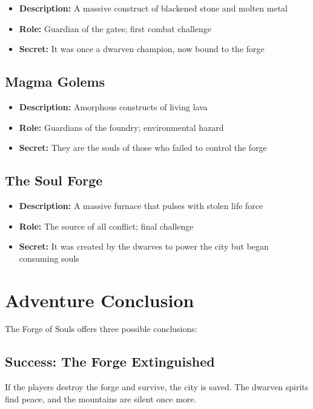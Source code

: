 \documentclass[11pt]{article}
\begin{document}
\begin{itemize}
    \item \textbf{Description:} A massive construct of blackened stone and molten metal
    \item \textbf{Role:} Guardian of the gates; first combat challenge
    \item \textbf{Secret:} It was once a dwarven champion, now bound to the forge
\end{itemize}

\subsection{Magma Golems}

\begin{itemize}
    \item \textbf{Description:} Amorphous constructs of living lava
    \item \textbf{Role:} Guardians of the foundry; environmental hazard
    \item \textbf{Secret:} They are the souls of those who failed to control the forge
\end{itemize}

\subsection{The Soul Forge}

\begin{itemize}
    \item \textbf{Description:} A massive furnace that pulses with stolen life force
    \item \textbf{Role:} The source of all conflict; final challenge
    \item \textbf{Secret:} It was created by the dwarves to power the city but began consuming souls
\end{itemize}

\section{Adventure Conclusion}

The Forge of Souls offers three possible conclusions:

\subsection{Success: The Forge Extinguished}

If the players destroy the forge and survive, the city is saved. The dwarven spirits find peace, and the mountains are silent once more.
\end{document}
